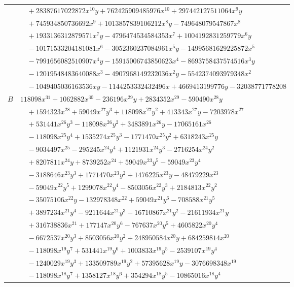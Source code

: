 \documentclass[11pt]{article}
\begin{document}
\begin{longtable}{@{}ll@{}}
 & $\quad +28387617022872x^{10}y+762425909485976x^{10}+297442127511064x^{9}y$\\
 & $\quad +745934850736692x^{9}+1013857839106212x^{8}y-749648079547867x^{8}$\\
 & $\quad +1933136312879571x^{7}y-4796474534584353x^{7}+1004192831259779x^{6}y$\\
 & $\quad -10171533204181081x^{6}-3052360237084961x^{5}y-14995681629225872x^{5}$\\
 & $\quad -7991656082510907x^{4}y-15915006743850623x^{4}-8693758437574516x^{3}y$\\
 & $\quad -12019548483640088x^{3}-4907968149232036x^{2}y-5542374093979348x^{2}$\\
 & $\quad -1049405036163536xy-1144253332432496x+4669413199776y-32038771778208$\\
$B$ & $118098x^{31}+1062882x^{30}-236196x^{29}y+2834352x^{29}-590490x^{28}y$\\
 & $\quad +1594323x^{28}+59049x^{27}y^{3}+118098x^{27}y^{2}+413343x^{27}y-7203978x^{27}$\\
 & $\quad +531441x^{26}y^{3}-118098x^{26}y^{2}+3483891x^{26}y-17065161x^{26}$\\
 & $\quad -118098x^{25}y^{4}+1535274x^{25}y^{3}-1771470x^{25}y^{2}+6318243x^{25}y$\\
 & $\quad -9034497x^{25}-295245x^{24}y^{4}+1121931x^{24}y^{3}-2716254x^{24}y^{2}$\\
 & $\quad +8207811x^{24}y+8739252x^{24}+59049x^{23}y^{5}-59049x^{23}y^{4}$\\
 & $\quad -3188646x^{23}y^{3}+1771470x^{23}y^{2}+1476225x^{23}y-48479229x^{23}$\\
 & $\quad -59049x^{22}y^{5}+1299078x^{22}y^{4}-8503056x^{22}y^{3}+2184813x^{22}y^{2}$\\
 & $\quad -35075106x^{22}y-132978348x^{22}+59049x^{21}y^{6}-708588x^{21}y^{5}$\\
 & $\quad +3897234x^{21}y^{4}-9211644x^{21}y^{3}-16710867x^{21}y^{2}-21611934x^{21}y$\\
 & $\quad +316738836x^{21}+177147x^{20}y^{6}-767637x^{20}y^{5}+4605822x^{20}y^{4}$\\
 & $\quad -6672537x^{20}y^{3}+8503056x^{20}y^{2}+248950584x^{20}y+684259814x^{20}$\\
 & $\quad -118098x^{19}y^{7}+531441x^{19}y^{6}+1003833x^{19}y^{5}-2539107x^{19}y^{4}$\\
 & $\quad -1240029x^{19}y^{3}+133509789x^{19}y^{2}+57395628x^{19}y-3076698348x^{19}$\\
 & $\quad -118098x^{18}y^{7}+1358127x^{18}y^{6}+354294x^{18}y^{5}-10865016x^{18}y^{4}$\\

\end{longtable}
\end{document}
